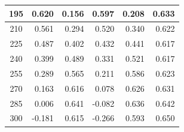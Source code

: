 \begin{table}[htbp]
\begin{center}
\begin{tabular}{|p{20mm}|p{20mm}|p{20mm}|p{20mm}|p{20mm}|p{20mm}|}
            \multicolumn{1}{|c|}{195}                     & \multicolumn{1}{|r|}{0.620}                         & \multicolumn{1}{|r|}{0.156}                   & \multicolumn{1}{|r|}{0.597}                     & \multicolumn{1}{|r|}{0.208}                   & \multicolumn{1}{|r|}{0.633}                         \\ \hline
            \multicolumn{1}{|c|}{210}                     & \multicolumn{1}{|r|}{0.561}                         & \multicolumn{1}{|r|}{0.294}                   & \multicolumn{1}{|r|}{0.520}                     & \multicolumn{1}{|r|}{0.340}                   & \multicolumn{1}{|r|}{0.622}                         \\ \hline
            \multicolumn{1}{|c|}{225}                     & \multicolumn{1}{|r|}{0.487}                         & \multicolumn{1}{|r|}{0.402}                   & \multicolumn{1}{|r|}{0.432}                     & \multicolumn{1}{|r|}{0.441}                   & \multicolumn{1}{|r|}{0.617}                         \\ \hline
            \multicolumn{1}{|c|}{240}                     & \multicolumn{1}{|r|}{0.399}                         & \multicolumn{1}{|r|}{0.489}                   & \multicolumn{1}{|r|}{0.331}                     & \multicolumn{1}{|r|}{0.521}                   & \multicolumn{1}{|r|}{0.617}                         \\ \hline
            \multicolumn{1}{|c|}{255}                     & \multicolumn{1}{|r|}{0.289}                         & \multicolumn{1}{|r|}{0.565}                   & \multicolumn{1}{|r|}{0.211}                     & \multicolumn{1}{|r|}{0.586}                   & \multicolumn{1}{|r|}{0.623}                         \\ \hline
            \multicolumn{1}{|c|}{270}                     & \multicolumn{1}{|r|}{0.163}                         & \multicolumn{1}{|r|}{0.616}                   & \multicolumn{1}{|r|}{0.078}                     & \multicolumn{1}{|r|}{0.626}                   & \multicolumn{1}{|r|}{0.631}                         \\ \hline
            \multicolumn{1}{|c|}{285}                     & \multicolumn{1}{|r|}{0.006}                         & \multicolumn{1}{|r|}{0.641}                   & \multicolumn{1}{|r|}{-0.082}                    & \multicolumn{1}{|r|}{0.636}                   & \multicolumn{1}{|r|}{0.642}                         \\ \hline
            \multicolumn{1}{|c|}{300}                     & \multicolumn{1}{|r|}{-0.181}                        & \multicolumn{1}{|r|}{0.615}                   & \multicolumn{1}{|r|}{-0.266}                    & \multicolumn{1}{|r|}{0.593}                   & \multicolumn{1}{|r|}{0.650}                         \\ \hline

\end{tabular}
\end{center}
\end{table}

